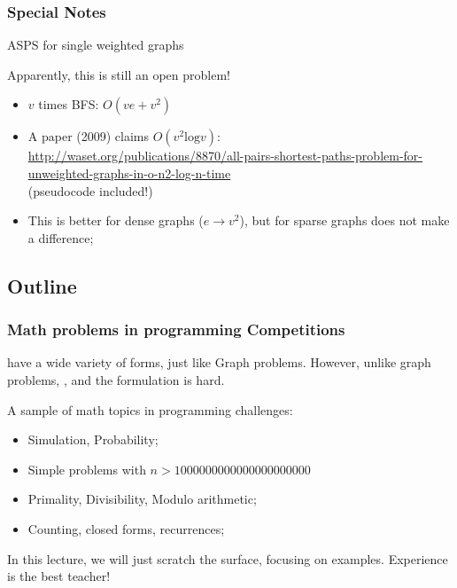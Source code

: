 \documentclass{beamer}
\begin{document}
\begin{frame}
  \frametitle{Special Notes}

  {\small
    \begin{block}{ASPS for single weighted graphs}

      Apparently, this is still an open problem!

      \begin{itemize}
      \item $v$ times BFS: $O(ve+v^2)$
      \item A paper (2009) claims $O(v^2\text{log}v)$:\\
        {\tiny 
        \url{http://waset.org/publications/8870/all-pairs-shortest-paths-problem-for-unweighted-graphs-in-o-n2-log-n-time}}\\
        (pseudocode included!)
      \item This is better for dense graphs ($e \rightarrow v^2$), but
        for sparse graphs does not make a difference;
      \end{itemize}
    \end{block}
  }
\end{frame}

\subsection{Outline}
\begin{frame}
  \frametitle{Math problems in programming Competitions} {\smaller
     have a wide variety of forms, just like
    Graph problems. However, unlike graph problems, , and \alert{the formulation is hard}.

    \bigskip

    A sample of math topics in programming challenges:
    \begin{itemize}
    \item {} Simulation, Probability;
    \item {} Simple problems with $n > 1000000000000000000000$      
    \item {} Primality, Divisibility, Modulo arithmetic;
    \item {} Counting, closed forms, recurrences;
    \end{itemize}
    
    \bigskip

    In this lecture, we will just scratch the surface, focusing on
    examples. Experience is the best teacher!
  }
\end{frame}
\end{document}

